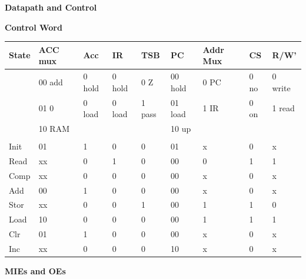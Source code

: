 \begin{enumerate}
\begin{solution}
{{\bf Datapath and Control}

\begin{figure}[ht]
\end{figure}

{\bf Control Word}

\tiny{
\begin{tabular}{l|l|l|l|l|l|l|l|l}
State & ACC mux	& Acc   & IR    & TSB   & PC	    & Addr Mux & CS	& R/W'	\\ \hline
      & 00 add & 0 hold & 0 hold & 0 Z    & 00 hold & 0 PC	& 0 no & 0 write \\ \hline
      & 01 0   & 0 load & 0 load & 1 pass & 01 load & 1 IR	& 0 on & 1 read \\ \hline
      & 10 RAM & 	& 	& 	& 10 up	&	 	& 	 & 	\\ \hline
      & 	& 	& 	& 	& 	& 	 	& 	 & 	\\ \hline
Init  &	01	& 1	& 0	& 0	& 01	&	x	& 0	& x	\\ \hline
Read  & xx	& 0	& 1	& 0	& 00	&	0	& 1	& 1	\\ \hline
Comp  & xx	& 0	& 0	& 0	& 00	&	x	& 0	& x	\\ \hline
Add   & 00	& 1	& 0	& 0	& 00	&	x	& 0	& x	\\ \hline
Stor  & xx	& 0	& 0	& 1	& 00	&	1	& 1	& 0	\\ \hline
Load  & 10	& 0	& 0	& 0	& 00	&	1	& 1	& 1	\\ \hline
Clr   & 01	& 1	& 0	& 0	& 00	&	x	& 0	& x	\\ \hline
Inc   & xx	& 0	& 0	& 0	& 10	&	x	& 0	& x	\\ 
\end{tabular}
}


{\bf MIEs and OEs}

}
\end{solution}
\end{enumerate}
